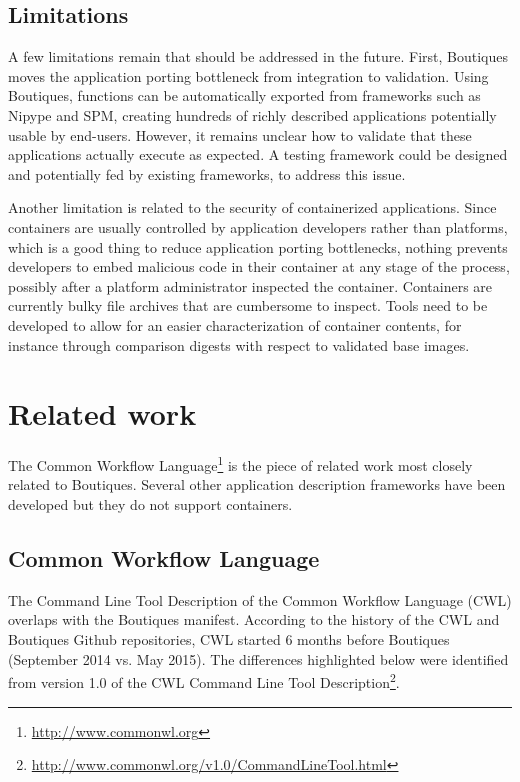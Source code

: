 \documentclass{article}
\newcommand{\boutiques}{Boutiques\xspace}
\begin{document}
\subsection{Limitations}

A few limitations remain that should be addressed in the
future. First, \boutiques moves the application porting bottleneck
from integration to validation. Using \boutiques, functions can be
automatically exported from frameworks such as Nipype and SPM,
creating hundreds of richly described applications potentially usable
by end-users. However, it remains unclear how to validate that these
applications actually execute as expected. A testing framework could
be designed and potentially fed by existing frameworks, to address
this issue.

Another limitation is related to the security of containerized
applications. Since containers are usually controlled by application
developers rather than platforms, which is a good thing to reduce
application porting bottlenecks, nothing prevents developers to embed
malicious code in their container at any stage of the process,
possibly after a platform administrator inspected the
container. Containers are currently bulky file archives that are
cumbersome to inspect. Tools need to be developed to allow for an
easier characterization of container contents, for instance through
comparison digests with respect to validated base images.


\section{Related work}

The Common Workflow Language\footnote{\url{http://www.commonwl.org}}
is the piece of related work most closely related to
\boutiques. Several other application description frameworks have been
developed but they do not support containers.

\subsection{Common Workflow Language}

The Command Line Tool Description of the Common Workflow Language
(CWL) overlaps with the \boutiques manifest. According to the history
of the CWL and \boutiques Github repositories, CWL started 6 months
before Boutiques (September 2014 vs. May 2015). The differences
highlighted below were identified from version 1.0 of the CWL Command
Line Tool
Description\footnote{\url{http://www.commonwl.org/v1.0/CommandLineTool.html}}.
\end{document}
